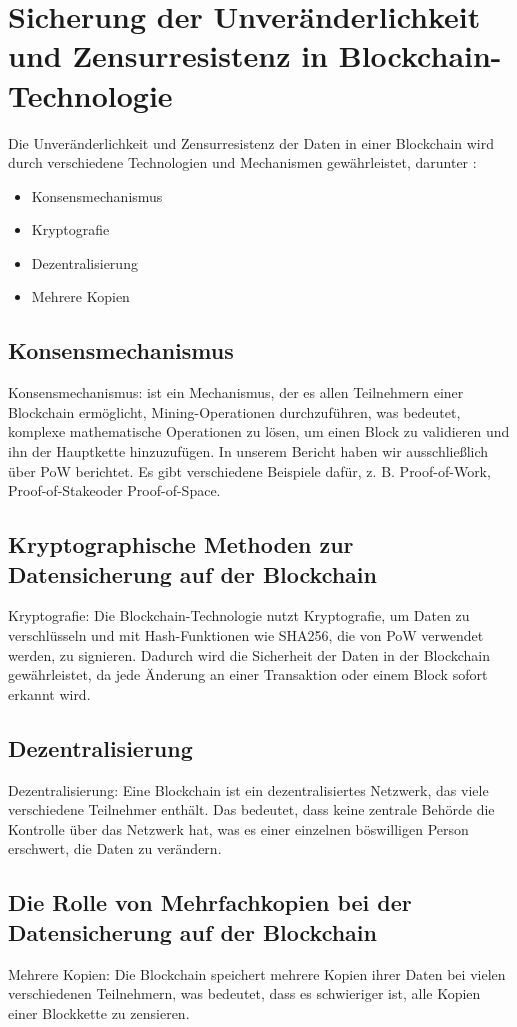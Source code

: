 \section{Sicherung der Unveränderlichkeit und Zensurresistenz in Blockchain-Technologie}

Die Unveränderlichkeit und Zensurresistenz der Daten in einer Blockchain wird durch verschiedene Technologien und Mechanismen gewährleistet, darunter :

\begin{itemize}
	\item Konsensmechanismus
	\item Kryptografie
	\item Dezentralisierung
	\item Mehrere Kopien
\end{itemize} 
\subsection{Konsensmechanismus}\label{blockchain:konsensmechanismus}
Konsensmechanismus: ist ein Mechanismus, der es allen Teilnehmern einer Blockchain ermöglicht, Mining-Operationen durchzuführen, was bedeutet, komplexe mathematische Operationen zu lösen, um einen Block zu validieren und ihn der Hauptkette hinzuzufügen. In unserem Bericht haben wir ausschließlich über PoW berichtet. Es gibt verschiedene Beispiele dafür, z. B. \dq Proof-of-Work\dq, \dq Proof-of-Stake\dq oder \dq Proof-of-Space\dq.
\subsection{Kryptographische Methoden zur Datensicherung auf der Blockchain}
Kryptografie: Die Blockchain-Technologie nutzt Kryptografie, um Daten zu verschlüsseln und mit Hash-Funktionen wie SHA256, die von PoW verwendet werden, zu signieren. Dadurch wird die Sicherheit der Daten in der Blockchain gewährleistet, da jede Änderung an einer Transaktion oder einem Block sofort erkannt wird.
\subsection{Dezentralisierung}\label{blockchain:dezentralisierung}
Dezentralisierung: Eine Blockchain ist ein dezentralisiertes Netzwerk, das viele verschiedene Teilnehmer enthält. Das bedeutet, dass keine zentrale Behörde die Kontrolle über das Netzwerk hat, was es einer einzelnen böswilligen Person erschwert, die Daten zu verändern.
\subsection{Die Rolle von Mehrfachkopien bei der Datensicherung auf der Blockchain}\label{blockchain:kopien} 
Mehrere Kopien: Die Blockchain speichert mehrere Kopien ihrer Daten bei vielen verschiedenen Teilnehmern, was bedeutet, dass es schwieriger ist, alle Kopien einer Blockkette zu zensieren.

